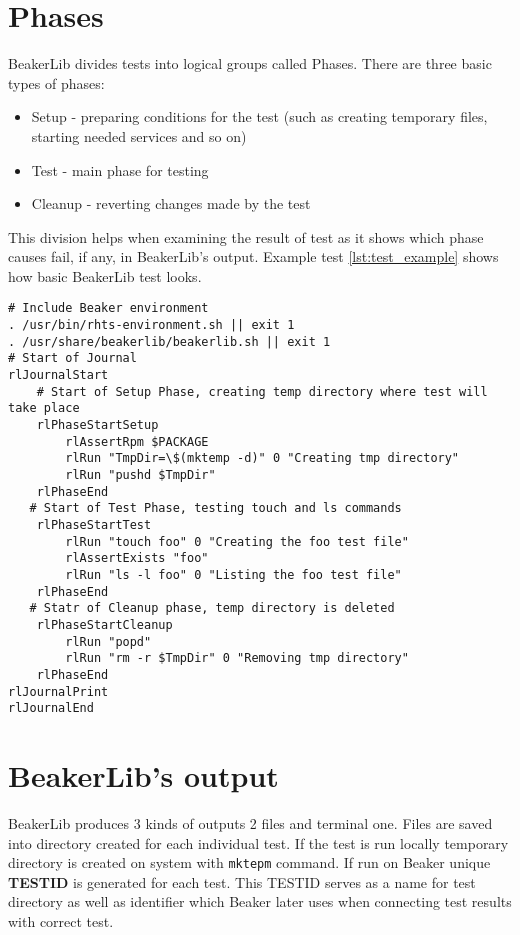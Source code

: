 \section{Phases}
BeakerLib divides tests into logical groups called Phases. There are three basic types of phases:
\begin{itemize}
\item Setup - preparing conditions for the test (such as creating temporary files, starting needed services and so on)
\item Test - main phase for testing
\item Cleanup - reverting changes made by the test
\end{itemize}
This division helps when examining the result of test as it shows which phase causes fail, if any, in BeakerLib's output. Example test \ref{lst:test_example} shows how basic BeakerLib test looks.
\\
\begin{lstlisting}[style=beakerlib_bash,caption={BeakerLib basic test example},label={lst:test_example}]
# Include Beaker environment
. /usr/bin/rhts-environment.sh || exit 1
. /usr/share/beakerlib/beakerlib.sh || exit 1
# Start of Journal
rlJournalStart
    # Start of Setup Phase, creating temp directory where test will take place 
    rlPhaseStartSetup
        rlAssertRpm $PACKAGE
        rlRun "TmpDir=\$(mktemp -d)" 0 "Creating tmp directory"
        rlRun "pushd $TmpDir"
    rlPhaseEnd
   # Start of Test Phase, testing touch and ls commands
    rlPhaseStartTest
        rlRun "touch foo" 0 "Creating the foo test file"
        rlAssertExists "foo"
        rlRun "ls -l foo" 0 "Listing the foo test file"
    rlPhaseEnd
   # Statr of Cleanup phase, temp directory is deleted
    rlPhaseStartCleanup
        rlRun "popd"
        rlRun "rm -r $TmpDir" 0 "Removing tmp directory"
    rlPhaseEnd
rlJournalPrint
rlJournalEnd
\end{lstlisting}


\section{BeakerLib's output}
BeakerLib produces 3 kinds of outputs 2 files and terminal one. Files are saved into directory created for each individual test. If the test is run locally temporary directory is created on system with \texttt{mktepm} command. If run on Beaker unique \textbf{TESTID} is generated for each test. This TESTID serves as a name for test directory as well as identifier which Beaker later uses when connecting test results with correct test.

